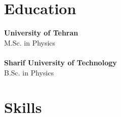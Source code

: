 \begin{CVsidebar}

\section{Education}
\textbf{University of Tehran}  \\
\vspace{0.2em}
M.Sc. {\footnotesize in Physics} \\
\vspace{0.4em}
 \\
\vspace{0.8em}
\textbf{Sharif University of Technology}  \\
\vspace{0.2em}
B.Sc. {\footnotesize in Physics} \\
\vspace{0.4em}

\section{Skills}


\end{CVsidebar}
